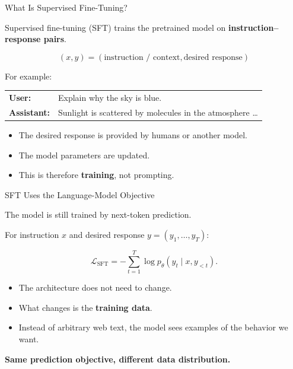 \documentclass[11pt,compress,t,notes=noshow, xcolor=table]{beamer}
\begin{document}
\begin{vbframe}{What Is Supervised Fine-Tuning?}

Supervised fine-tuning (SFT) trains the pretrained model on
\textbf{instruction--response pairs}.

\[
(x,y)
=
(\text{instruction / context},\text{desired response})
\]

For example:

\begin{center}
\begin{tabular}{ll}
\textbf{User:} &
Explain why the sky is blue.\\
\textbf{Assistant:} &
Sunlight is scattered by molecules in the atmosphere \ldots
\end{tabular}
\end{center}

\begin{itemize}
    \item The desired response is provided by humans or another model.
    \item The model parameters are updated.
    \item This is therefore \textbf{training}, not prompting.
\end{itemize}

\end{vbframe}



\begin{vbframe}{SFT Uses the Language-Model Objective}

The model is still trained by next-token prediction.

For instruction $x$ and desired response
$y=(y_1,\ldots,y_T)$:

\[
\mathcal{L}_{\mathrm{SFT}}
=
-\sum_{t=1}^{T}
\log p_\theta
\left(
y_t
\mid
x,y_{<t}
\right).
\]

\begin{itemize}
    \item The architecture does not need to change.
    \item What changes is the \textbf{training data}.
    \item Instead of arbitrary web text, the model sees examples of
          the behavior we want.
\end{itemize}

\begin{center}
\textbf{Same prediction objective, different data distribution.}
\end{center}

\end{vbframe}
\end{document}
